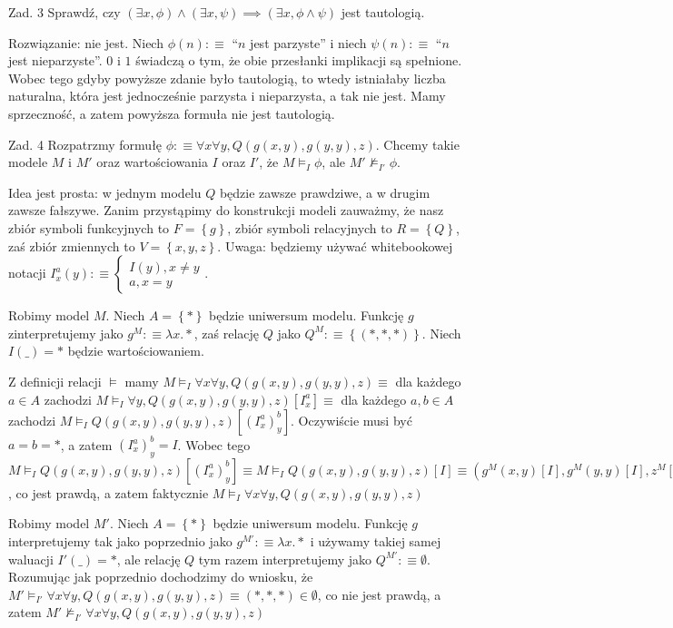 \documentclass[11pt]{article}
\newcommand{\df}{:\equiv}
\newcommand{\set}[1]{\left\{#1\right\}}
\newcommand{\case}[1]{\begin{cases}#1\end{cases}}
\begin{document}
	\newpage
	
	\par Zad. 3 Sprawdź, czy $(\exists x, \phi) \land (\exists x, \psi) \implies (\exists x, \phi \land \psi)$ jest tautologią.
	\par Rozwiązanie: nie jest. Niech $\phi(n) \df $ ``$n$ jest parzyste'' i niech $\psi(n) \df $ ``$n$ jest nieparzyste''. $0$ i $1$ świadczą o tym, że obie przesłanki implikacji są spełnione. Wobec tego gdyby powyższe zdanie było tautologią, to wtedy istniałaby liczba naturalna, która jest jednocześnie parzysta i nieparzysta, a tak nie jest. Mamy sprzeczność, a zatem powyższa formuła nie jest tautologią.
	
	\newpage
	
	\par Zad. 4 Rozpatrzmy formułę $\phi \df \forall x \forall y, Q(g(x, y), g(y, y), z)$. Chcemy takie modele $M$ i $M'$ oraz wartościowania $I$ oraz $I'$, że $M \models_I \phi$, ale $M' \not\models_{I'} \phi$.
	\par Idea jest prosta: w jednym modelu $Q$ będzie zawsze prawdziwe, a w drugim zawsze fałszywe. Zanim przystąpimy do konstrukcji modeli zauważmy, że nasz zbiór symboli funkcyjnych to $F = \set{g}$, zbiór symboli relacyjnych to $R = \set{Q}$, zaś zbiór zmiennych to $V = \set{x, y, z}$. Uwaga: będziemy używać whitebookowej notacji $I_x^a(y) \df \case{I(y), x \neq y \\ a, x = y}$.
	\par Robimy model $M$. Niech $A = \set{*}$ będzie uniwersum modelu. Funkcję $g$ zinterpretujemy jako $g^M \df \lambda x.*$, zaś relację $Q$ jako $Q^M \df \set{(*, *, *)}$. Niech $I(\_) = *$ będzie wartościowaniem.
	\par Z definicji relacji $\models$ mamy $M \models_I \forall x \forall y, Q(g(x, y), g(y, y), z) \equiv $ dla każdego $a \in A$ zachodzi $M \models_I \forall y, Q(g(x, y), g(y, y), z)[I_x^a] \equiv $ dla każdego $a, b \in A$ zachodzi $M \models_I Q(g(x, y), g(y, y), z)[(I_x^a)_y^b]$. Oczywiście musi być $a = b = *$, a zatem $(I_x^a)_y^b = I$. Wobec tego $M \models_I Q(g(x, y), g(y, y), z)[(I_x^a)_y^b] \equiv M \models_I Q(g(x, y), g(y, y), z)[I] \equiv (g^M(x, y)[I], g^M(y, y)[I], z^M[I]) \in Q^M \equiv ((\lambda x.*)(*, *), (\lambda x.*)(*, *), *) \in \set{(*, *, *)} \equiv (*, *, *) \in \set{(*, *, *)}$, co jest prawdą, a zatem faktycznie $M \models_I \forall x \forall y, Q(g(x, y), g(y, y), z)$
	\par Robimy model $M'$. Niech $A = \set{*}$ będzie uniwersum modelu. Funkcję $g$ interpretujemy tak jako poprzednio jako $g^{M'} \df \lambda x.*$ i używamy takiej samej waluacji $I'(\_) = *$, ale relację $Q$ tym razem interpretujemy jako $Q^{M'} \df \emptyset$. Rozumując jak poprzednio dochodzimy do wniosku, że $M' \models_{I'} \forall x \forall y, Q(g(x, y), g(y, y), z) \equiv (*, *, *) \in \emptyset$, co nie jest prawdą, a zatem $M' \not\models_{I'} \forall x \forall y, Q(g(x, y), g(y, y), z)$
\end{document}
